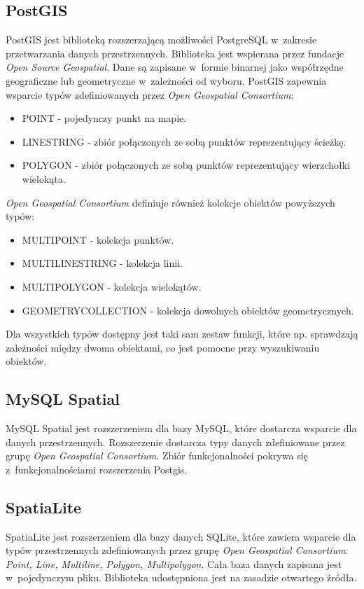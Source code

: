 \documentclass[archivemode]{mgr}
\begin{document}
\subsection{PostGIS}
PostGIS jest biblioteką rozszerzającą możliwości PostgreSQL w~zakresie przetwarzania danych przestrzennych. Biblioteka jest wspierana przez fundacje \textit{Open Source Geospatial}. \cite{doc_postgis} Dane są zapisane w~formie binarnej jako współrzędne geograficzne lub geometryczne w~zależności od wyboru. PostGIS zapewnia wsparcie typów zdefiniowanych przez \textit{Open Geospatial Consortium}:
\begin{itemize}
  \item POINT - pojedynczy punkt na mapie.
  \item LINESTRING - zbiór połączonych ze sobą punktów reprezentujący ścieżkę.
  \item POLYGON - zbiór połączonych ze sobą punktów reprezentujący wierzchołki wielokąta.
\end{itemize} 
\textit{Open Geospatial Consortium} definiuje również kolekcje obiektów powyższych typów:
\begin{itemize}
  \item MULTIPOINT - kolekcja punktów.
  \item MULTILINESTRING - kolekcja linii.
  \item MULTIPOLYGON - kolekcja wielokątów.
  \item GEOMETRYCOLLECTION - kolekcja dowolnych obiektów geometrycznych.
\end{itemize}
Dla wszystkich typów dostępny jest taki sam zestaw funkcji, które np. sprawdzają zależności między dwoma obiektami, co jest pomocne przy wyszukiwaniu obiektów.

\subsection{MySQL Spatial}
MySQL Spatial jest rozszerzeniem dla bazy MySQL, które dostarcza wsparcie dla danych przestrzennych. Rozszerzenie dostarcza typy danych zdefiniowane przez grupę \textit{Open Geospatial Consortium}. \cite{doc_mysql} Zbiór funkcjonalności pokrywa się z~funkcjonalnościami rozszerzenia Postgis.
\subsection{SpatiaLite}
SpatiaLite jest rozszerzeniem dla bazy danych SQLite, które zawiera wsparcie dla typów przestrzennych zdefiniowanych przez grupę \textit{Open Geospatial Consortium}\cite{doc_spatialite}: \textit{Point, Line, Multiline, Polygon, Multipolygon}. Cała baza danych zapisana jest w~pojedynczym pliku. Biblioteka udostępniona jest na zasadzie otwartego źródła.
\end{document}
